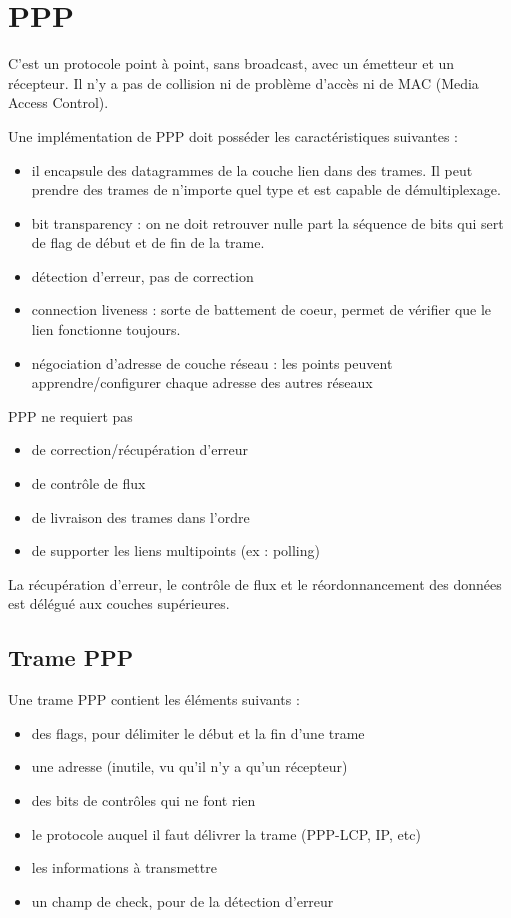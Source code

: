 \section{PPP}

C'est un protocole point à point, sans broadcast, avec un émetteur et un récepteur. Il n'y a pas de collision ni de problème d'accès ni de MAC (Media Access Control).

Une implémentation de PPP doit posséder les caractéristiques suivantes :

\begin{itemize}
	\item il encapsule des datagrammes de la couche lien dans des trames. Il peut prendre des trames de n'importe quel type et est capable de démultiplexage.
	\item bit transparency : on ne doit retrouver nulle part la séquence de bits qui sert de flag de début et de fin de la trame.
	\item détection d'erreur, pas de correction
	\item connection liveness : sorte de battement de coeur, permet de vérifier que le lien fonctionne toujours.
	\item négociation d'adresse de couche réseau : les points peuvent apprendre/configurer chaque adresse des autres réseaux
\end{itemize}

PPP ne requiert pas

\begin{itemize}
	\item de correction/récupération d'erreur
	\item de contrôle de flux
	\item de livraison des trames dans l'ordre
	\item de supporter les liens multipoints (ex : polling)
\end{itemize}

La récupération d'erreur, le contrôle de flux et le réordonnancement des données est délégué aux couches supérieures.

	\subsection{Trame PPP}
	
	Une trame PPP contient les éléments suivants :
	
	\begin{itemize}
		\item des flags, pour délimiter le début et la fin d'une trame
		\item une adresse (inutile, vu qu'il n'y a qu'un récepteur)
		\item des bits de contrôles qui ne font rien
		\item le protocole auquel il faut délivrer la trame (PPP-LCP, IP, etc)
		\item les informations à transmettre
		\item un champ de check, pour de la détection d'erreur
	\end{itemize}
	
